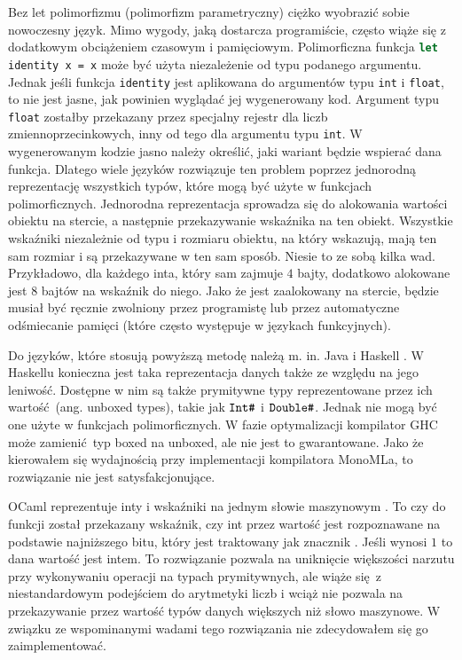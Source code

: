 \documentclass[declaration,shortabstract]{iithesis}
\begin{document}
Bez let polimorfizmu (polimorfizm parametryczny) ciężko wyobrazić sobie 
nowoczesny język. 
Mimo wygody, jaką dostarcza programiście, często wiąże się z dodatkowym
obciążeniem czasowym i pamięciowym. Polimorficzna funkcja  \newline
\lstinline[language=Caml]!let identity x = x! może być użyta niezależenie
od typu podanego argumentu. Jednak jeśli funkcja \texttt{identity} 
jest aplikowana do argumentów typu \texttt{int} i \texttt{float}, to nie jest 
jasne, jak powinien wyglądać jej wygenerowany kod. Argument typu \texttt{float}
zostałby przekazany przez specjalny rejestr dla liczb zmiennoprzecinkowych, 
inny od tego dla argumentu typu \texttt{int}. W wygenerowanym kodzie jasno
należy określić, jaki wariant będzie wspierać dana funkcja. Dlatego wiele 
języków rozwiązuje ten problem poprzez jednorodną reprezentację wszystkich 
typów, które mogą być użyte w funkcjach polimorficznych. Jednorodna 
reprezentacja sprowadza się do alokowania wartości obiektu na stercie, a 
następnie przekazywanie wskaźnika na ten obiekt. Wszystkie wskaźniki 
niezależnie od typu i rozmiaru obiektu, na który wskazują, mają ten sam 
rozmiar i są przekazywane w ten sam sposób. Niesie to ze sobą kilka wad.
Przykładowo, dla każdego inta, który sam zajmuje $4$ bajty,
dodatkowo alokowane jest $8$ bajtów na wskaźnik do niego. Jako że jest 
zaalokowany na stercie, będzie musiał być ręcznie zwolniony przez programistę 
lub przez automatyczne odśmiecanie pamięci (które często występuje w językach 
funkcyjnych).

 
Do języków, które stosują powyższą metodę należą m. in. Java 
\cite{type_erasure} i Haskell 
\cite[Haskell implementation]{haskell_poly}.
W Haskellu konieczna jest taka reprezentacja danych także ze względu na jego 
leniwość. Dostępne w nim są także prymitywne typy reprezentowane przez 
ich wartość (ang. unboxed types), takie jak $\verb!Int#!$ i 
$\verb!Double#!$. Jednak nie mogą być one użyte w funkcjach polimorficznych. 
W fazie optymalizacji kompilator GHC może zamienić typ boxed 
na unboxed, ale nie jest to gwarantowane. Jako że kierowałem się wydajnością
przy implementacji kompilatora MonoMLa, to rozwiązanie nie jest 
satysfakcjonujące.

OCaml reprezentuje inty i wskaźniki na jednym słowie 
maszynowym \cite{levity_polymorphism}. 
To czy do funkcji został przekazany wskaźnik, czy int
przez wartość jest rozpoznawane na podstawie najniższego bitu, który jest 
traktowany jak znacznik \cite[Chapter 20]{real_ocaml}.
Jeśli wynosi $1$ to dana wartość jest intem.
To rozwiązanie pozwala na uniknięcie większości narzutu przy wykonywaniu 
operacji na typach prymitywnych, ale wiąże się z niestandardowym podejściem do 
arytmetyki liczb i wciąż nie pozwala na przekazywanie przez wartość typów danych 
większych niż słowo maszynowe. W związku ze wspominanymi wadami tego 
rozwiązania nie zdecydowałem się go zaimplementować.
\end{document}
